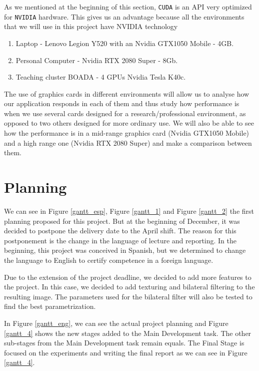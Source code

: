 \documentclass[titlepage,12pt]{article}
\begin{document}
As we mentioned at the beginning of this section,  \texttt{CUDA} is an API very optimized for \texttt{NVIDIA} hardware. This gives us an advantage because all the environments that we will use in this project have NVIDIA technology

\begin{enumerate}
	\item Laptop - Lenovo Legion Y520 with an Nvidia GTX1050 Mobile - 4GB.
	\item Personal Computer - Nvidia RTX 2080 Super - 8Gb.
	\item Teaching cluster BOADA - 4 GPUs Nvidia Tesla K40c.
\end{enumerate}

The use of graphics cards in different environments will allow us to analyse how our application responds in each of them and thus study how performance is when we use several cards designed for a research/professional environment, as opposed to two others designed for more ordinary use. We will also be able to see how the performance is in a mid-range graphics card (Nvidia GTX1050 Mobile) and a high range one (Nvidia RTX 2080 Super) and make a comparison between them.

\section{Planning}

We can see in Figure \ref{gantt_esp}, Figure \ref{gantt_1} and Figure \ref{gantt_2} the first planning proposed for this project. But at the beginning of December, it was decided to postpone the delivery date to the April shift. The reason for this postponement is the change in the language of lecture and reporting. In the beginning, this project was conceived in Spanish, but we determined to change the language to English to certify competence in a foreign language.

Due to the extension of the project deadline, we decided to add more features to the project. In this case, we decided to add texturing and bilateral filtering to the resulting image. The parameters used for the bilateral filter will also be tested to find the best parametrization.

In Figure \ref{gantt_eng}, we can see the actual project planning and Figure \ref{gantt_4} shows the new stages added to the Main Development task. The other sub-stages from the Main Development task remain equals. The Final Stage is focused on the experiments and writing the final report as we can see in Figure \ref{gantt_4}.
\end{document}
